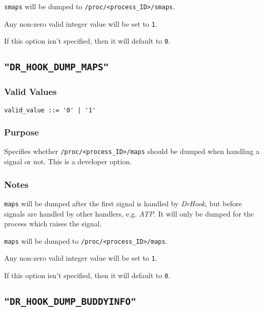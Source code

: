 \texttt{smaps} will be dumped to \verb|/proc/<process_ID>/smaps|.

Any non-zero valid integer value will be set to \verb|1|.

If this option isn't specified, then it will default to \verb|0|.



\subsection{\texttt{"DR\_HOOK\_DUMP\_MAPS"}}
\label{section:flags:DR_HOOK_DUMP_MAPS}
\vspace{-2ex}
\subsubsection{Valid Values}
\vspace{-2ex}
\verb+valid_value ::= '0' | '1'+ 

\vspace{-2ex}
\subsubsection{Purpose}
\vspace{-2ex}
Specifies whether \verb|/proc/<process_ID>/maps| should be dumped when handling a signal or not. This is a developer option.

\vspace{-2ex}
\subsubsection{Notes}
\vspace{-2ex}
\texttt{maps} will be dumped after the first signal is handled by \textit{DrHook}, but before signals are handled by other handlers, e.g. \textit{ATP}. It will only be dumped for the process which raises the signal.

\texttt{maps} will be dumped to \verb|/proc/<process_ID>/maps|.

Any non-zero valid integer value will be set to \verb|1|.

If this option isn't specified, then it will default to \verb|0|.



\subsection{\texttt{"DR\_HOOK\_DUMP\_BUDDYINFO"}}
\label{section:flags:DR_HOOK_DUMP_BUDDYINFO}
\vspace{-2ex}
